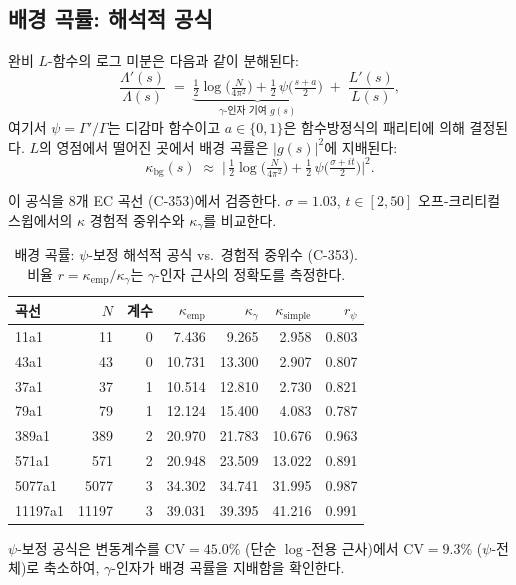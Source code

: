 \documentclass[11pt, a4paper]{article}
\theoremstyle{plain}
\theoremstyle{definition}
\begin{document}
\subsection{배경 곡률: 해석적 공식}
\label{ssec:kappabg}

완비 $L$-함수의 로그 미분은 다음과 같이 분해된다:
\[
  \frac{\Lambda'(s)}{\Lambda(s)}
  \;=\; \underbrace{\tfrac{1}{2}\log\!\bigl(\tfrac{N}{4\pi^{2}}\bigr)
        + \tfrac{1}{2}\,\psi\!\bigl(\tfrac{s+a}{2}\bigr)}_{\displaystyle
        \gamma\text{-인자 기여 } g(s)}
  \;+\; \frac{L'(s)}{L(s)},
\]
여기서 $\psi = \Gamma'/\Gamma$는 디감마 함수이고
$a\in\{0,1\}$은 함수방정식의 패리티에 의해 결정된다.
$L$의 영점에서 떨어진 곳에서 배경 곡률은 $|g(s)|^{2}$에 지배된다:
\[
  \kappa_{\mathrm{bg}}(s)
  \;\approx\;
  \bigl|\,\tfrac{1}{2}\log\!\bigl(\tfrac{N}{4\pi^{2}}\bigr)
  + \tfrac{1}{2}\,\psi\!\bigl(\tfrac{\sigma+it}{2}\bigr)\bigr|^{2}.
\]

이 공식을 8개 EC 곡선 (C-353)에서 검증한다.
$\sigma=1.03$, $t\in[2,50]$ 오프-크리티컬 스윕에서의
$\kappa$ 경험적 중위수와 $\kappa_{\gamma}$를 비교한다.

\begin{table}[ht]
\centering
\caption{배경 곡률: $\psi$-보정 해석적 공식 vs.\ 경험적 중위수 (C-353).
  비율 $r = \kappa_{\mathrm{emp}}/\kappa_{\gamma}$는
  $\gamma$-인자 근사의 정확도를 측정한다.}
\label{tab:kappabg}
\small
\begin{tabular}{lrrrrrr}
\toprule
곡선 & $N$ & 계수 & $\kappa_{\mathrm{emp}}$ & $\kappa_{\gamma}$ &
  $\kappa_{\mathrm{simple}}$ & $r_{\psi}$ \\
\midrule
11a1    &    11 & 0 &  7.436 &  9.265 &  2.958 & 0.803 \\
43a1    &    43 & 0 & 10.731 & 13.300 &  2.907 & 0.807 \\
37a1    &    37 & 1 & 10.514 & 12.810 &  2.730 & 0.821 \\
79a1    &    79 & 1 & 12.124 & 15.400 &  4.083 & 0.787 \\
389a1   &   389 & 2 & 20.970 & 21.783 & 10.676 & 0.963 \\
571a1   &   571 & 2 & 20.948 & 23.509 & 13.022 & 0.891 \\
5077a1  &  5077 & 3 & 34.302 & 34.741 & 31.995 & 0.987 \\
11197a1 & 11197 & 3 & 39.031 & 39.395 & 41.216 & 0.991 \\
\bottomrule
\end{tabular}
\end{table}

$\psi$-보정 공식은 변동계수를
$\mathrm{CV}=45.0\%$ (단순 $\log$-전용 근사)에서
$\mathrm{CV}=9.3\%$ ($\psi$-전체)로 축소하여,
$\gamma$-인자가 배경 곡률을 지배함을 확인한다.
\end{document}
